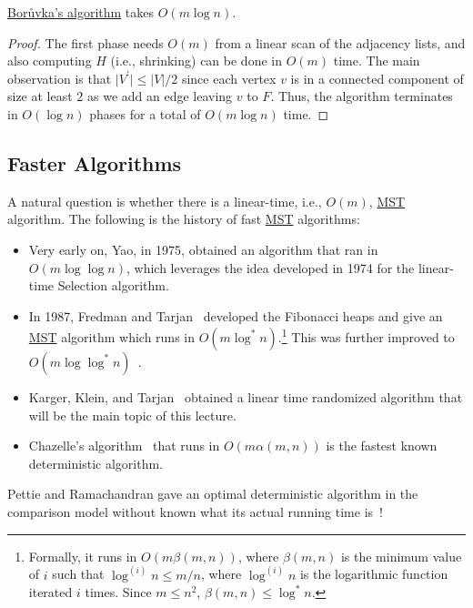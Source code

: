 \begin{theorem}\label{thm:Boruvka}
	\hyperref[algo:Boruvka]{Borůvka's algorithm} takes \(O(m \log n)\).
\end{theorem}
\begin{proof}
	The first phase needs \(O(m)\) from a linear scan of the adjacency lists, and also computing \(H\) (i.e., shrinking) can be done in \(O(m)\) time. The main observation is that \(\lvert V^{\prime} \rvert \leq \lvert V \rvert / 2\) since each vertex \(v\) is in a connected component of size at least \(2\) as we add an edge leaving \(v\) to \(F\). Thus, the algorithm terminates in \(O(\log n)\) phases for a total of \(O(m \log n)\) time.
\end{proof}

\subsection{Faster Algorithms}
A natural question is whether there is a linear-time, i.e., \(O(m)\), \hyperref[prb:MST]{MST} algorithm. The following is the history of fast \hyperref[prb:MST]{MST} algorithms:
\begin{itemize}
	\item Very early on, Yao, in 1975, obtained an algorithm that ran in \(O(m \log \log n)\)\cite{yao1975log}, which leverages the idea developed in 1974 for the linear-time Selection algorithm.
	\item In 1987, Fredman and Tarjan~\cite{fredman1987fibonacci} developed the Fibonacci heaps and give an \hyperref[prb:MST]{MST} algorithm which runs in \(O(m \log ^{\ast} n)\).\footnote{Formally, it runs in \(O(m \beta (m, n))\), where \(\beta (m, n)\) is the minimum value of \(i\) such that \(\log^{(i)} n \leq m / n\), where \(\log ^{(i)} n\) is the logarithmic function iterated \(i\) times. Since \(m \leq n^2\), \(\beta (m, n) \leq \log ^{\ast} n\).} This was further improved to \(O(m \log \log ^{\ast} n)\)~\cite{gabow1986efficient}.
	\item Karger, Klein, and Tarjan~\cite{karger1995randomized} obtained a linear time randomized algorithm that will be the main topic of this lecture.
	\item Chazelle's algorithm~\cite{chazelle2000minimum} that runs in \(O(m \alpha (m, n))\) is the fastest known deterministic algorithm.
\end{itemize}

\begin{note}
	Pettie and Ramachandran gave an optimal deterministic algorithm in the comparison model without known what its actual running time is~\cite{pettie2002optimal}!
\end{note}

